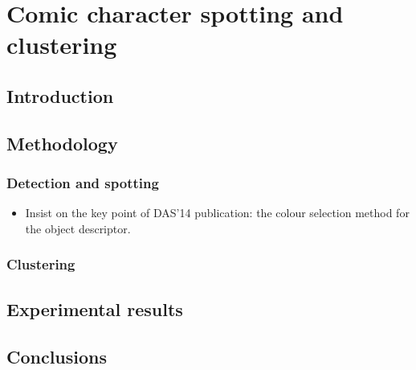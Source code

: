 \chapter{Comic character spotting and clustering}
\label{chap:ce}
\graphicspath{{./chapters/1-introduction/figs/}}

\section{Introduction}
\label{sec:ce:introduction}

\section{Methodology}
\label{sec:ce:methodology}

\subsection{Detection and spotting} %
\label{sub:ce:detection_and_spotting}

\begin{itemize}
	\item Insist on the key point of DAS'14 publication: the colour selection method for the object descriptor.
\end{itemize}

\subsection{Clustering} %
\label{sub:ce:clustering}



\section{Experimental results}
\label{sec:ce:experiments}

\section{Conclusions}
\label{sec:ce:conclusion}